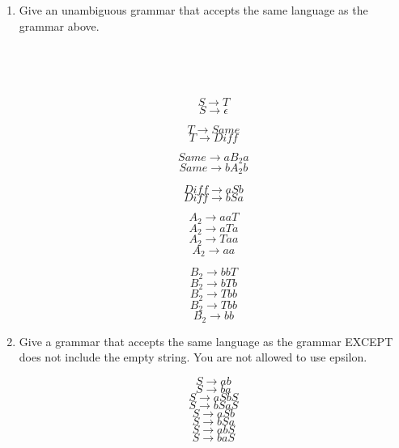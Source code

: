 \begin{enumerate}
\begin{enumerate}
\begin{tikzpicture}[sibling distance=10em,
        every node/.style = {draw,circle, align=center}]
      \end{tikzpicture}\\

      \item Give an unambiguous grammar that accepts the same language as the grammar above.\\\\\\\\\\
      
      $$S \rightarrow T$$
      $$S \rightarrow \epsilon$$

      $$T \rightarrow Same$$
      $$T \rightarrow Diff$$

      $$Same \rightarrow a B_2 a$$
      $$Same \rightarrow b A_2 b$$

      $$Diff \rightarrow a S b$$
      $$Diff \rightarrow b S a$$

      $$A_2 \rightarrow a a T$$
      $$A_2 \rightarrow a T a$$
      $$A_2 \rightarrow T a a$$
      $$A_2 \rightarrow a a$$

      $$B_2 \rightarrow b b T$$
      $$B_2 \rightarrow b T b$$
      $$B_2 \rightarrow T b b$$
      $$B_2 \rightarrow T b b$$
      $$B_2 \rightarrow b b$$

      \item Give a grammar that accepts the same language as the grammar EXCEPT does not include the empty string. You are not allowed to use epsilon.

      $$S \rightarrow ab$$
      $$S \rightarrow ba$$
      $$S \rightarrow aSbS$$
      $$S \rightarrow bSaS$$
      $$S \rightarrow aSb$$
      $$S \rightarrow bSa$$
      $$S \rightarrow abS$$
      $$S \rightarrow baS$$
    \end{enumerate}


\end{enumerate}
